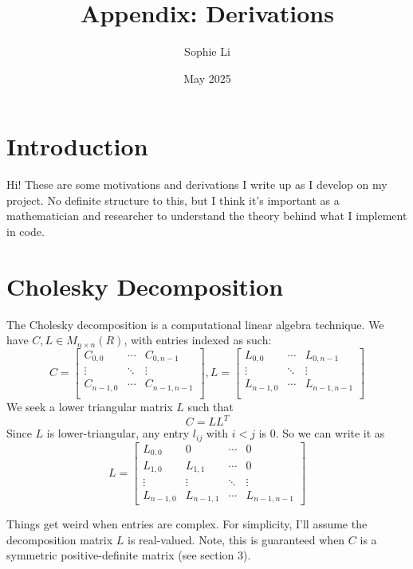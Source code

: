 \documentclass{article}
\title{Appendix: Derivations}
\author{Sophie Li }
\date{May 2025}
\begin{document}
\maketitle

\section{Introduction}
Hi! These are some motivations and derivations I write up as I develop on my project. No definite structure to this, but I think it's important as a mathematician and researcher to understand the theory behind what I implement in code.  

\section{Cholesky Decomposition}
The Cholesky decomposition is a computational linear algebra technique. 
We have $C,L \in M_{n \times n}(R)$, with entries indexed as such: 
$$ C = \begin{bmatrix}
C_{0,0} & \cdots & C_{0,n-1} \\
\vdots & \ddots & \vdots \\
C_{n-1,0} & \cdots & C_{n-1,n-1} \\
\end{bmatrix}, L = \begin{bmatrix}
L_{0,0} & \cdots & L_{0,n-1} \\
\vdots & \ddots & \vdots \\
L_{n-1,0} & \cdots & L_{n-1,n-1} \\
\end{bmatrix}
$$
We seek a lower triangular matrix $L$ such that 
$$ C = LL^T$$
Since $L$ is lower-triangular, any entry $l_{ij}$ with $i < j$ is 0. So we can write it as 
$$ L = \begin{bmatrix}
L_{0,0} & 0        & \cdots & 0 \\
L_{1,0} & L_{1,1}  & \cdots & 0 \\
\vdots  & \vdots   & \ddots & \vdots \\
L_{n-1,0} & L_{n-1,1} & \cdots & L_{n-1,n-1}
\end{bmatrix}$$

\noindent Things get weird when entries are complex. For simplicity, I'll assume the decomposition matrix $L$ is real-valued. Note, this is guaranteed when $C$ is a symmetric positive-definite matrix (see section 3). \bigskip
\end{document}
